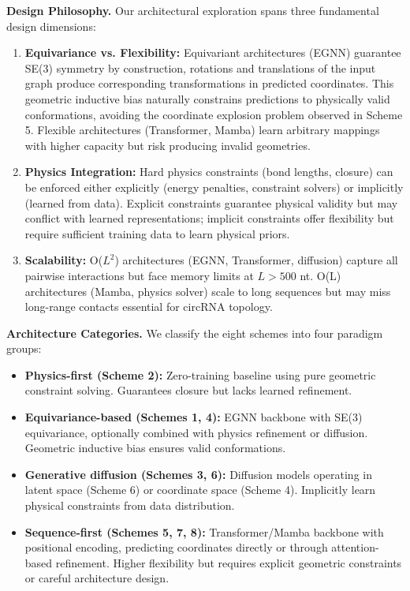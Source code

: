 \documentclass[12pt]{article}
\begin{document}
\textbf{Design Philosophy.} Our architectural exploration spans three fundamental design dimensions:

\begin{enumerate}
\item \textbf{Equivariance vs. Flexibility:} Equivariant architectures (EGNN) guarantee SE(3) symmetry by construction, rotations and translations of the input graph produce corresponding transformations in predicted coordinates. This geometric inductive bias naturally constrains predictions to physically valid conformations, avoiding the coordinate explosion problem observed in Scheme 5. Flexible architectures (Transformer, Mamba) learn arbitrary mappings with higher capacity but risk producing invalid geometries.

\item \textbf{Physics Integration:} Hard physics constraints (bond lengths, closure) can be enforced either explicitly (energy penalties, constraint solvers) or implicitly (learned from data). Explicit constraints guarantee physical validity but may conflict with learned representations; implicit constraints offer flexibility but require sufficient training data to learn physical priors.

\item \textbf{Scalability:} O($L^2$) architectures (EGNN, Transformer, diffusion) capture all pairwise interactions but face memory limits at $L>500$ nt. O(L) architectures (Mamba, physics solver) scale to long sequences but may miss long-range contacts essential for circRNA topology.
\end{enumerate}

\textbf{Architecture Categories.} We classify the eight schemes into four paradigm groups:

\begin{itemize}
\item \textbf{Physics-first (Scheme 2):} Zero-training baseline using pure geometric constraint solving. Guarantees closure but lacks learned refinement.

\item \textbf{Equivariance-based (Schemes 1, 4):} EGNN backbone with SE(3) equivariance, optionally combined with physics refinement or diffusion. Geometric inductive bias ensures valid conformations.

\item \textbf{Generative diffusion (Schemes 3, 6):} Diffusion models operating in latent space (Scheme 6) or coordinate space (Scheme 4). Implicitly learn physical constraints from data distribution.

\item \textbf{Sequence-first (Schemes 5, 7, 8):} Transformer/Mamba backbone with positional encoding, predicting coordinates directly or through attention-based refinement. Higher flexibility but requires explicit geometric constraints or careful architecture design.
\end{itemize}
\end{document}
